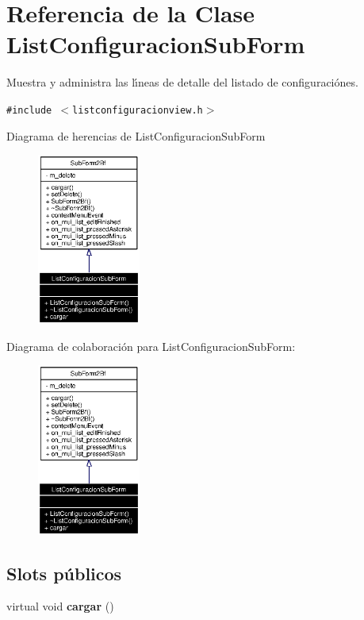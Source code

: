 \section{Referencia de la Clase List\-Configuracion\-Sub\-Form}
\label{classListConfiguracionSubForm}
Muestra y administra las l\'{\i}neas de detalle del listado de configuraci\'{o}nes.  


{\tt \#include $<$listconfiguracionview.h$>$}

Diagrama de herencias de List\-Configuracion\-Sub\-Form\begin{figure}[H]
\begin{center}
\leavevmode
\includegraphics[width=96pt]{classListConfiguracionSubForm__inherit__graph}
\end{center}
\end{figure}
Diagrama de colaboraci\'{o}n para List\-Configuracion\-Sub\-Form:\begin{figure}[H]
\begin{center}
\leavevmode
\includegraphics[width=96pt]{classListConfiguracionSubForm__coll__graph}
\end{center}
\end{figure}
\subsection*{Slots p\'{u}blicos}
\begin{CompactItemize}
\item 
virtual void {\bf cargar} ()\label{classListConfiguracionSubForm_i0}

\end{CompactItemize}
